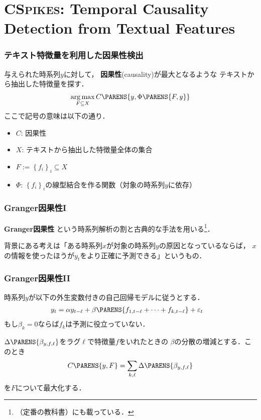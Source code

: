 \documentclass[12pt,noamssymb,usepdftitle=false]{beamer}
\newcommand{\braces}[1]{\left\{#1\right\}}
\DeclareMathOperator*{\argmax}{arg\,max}
\begin{document}
\section{CS\textsc{pikes}: Temporal Causality Detection from Textual Features}
\begin{frame}
    \frametitle{テキスト特徴量を利用した因果性検出}
    与えられた時系列$y$に対して，
    \textbf{因果性}(causality)が最大となるような
    テキストから抽出した特徴量を探す．
    \begin{align}
        \argmax_{F \subseteq X} {C}\PARENS{y, \Phi\PARENS{F,y}}
    \end{align}
    ここで記号の意味は以下の通り．
    \begin{itemize}
        \item ${C}$: 因果性
        \item $X$: テキストから抽出した特徴量全体の集合
        \item $F:=\braces{f_i}_i \subseteq X$
        \item $\Phi$: $\braces{f_i}_i$の線型結合を作る関数（対象の時系列$y$に依存）
    \end{itemize}

\end{frame}

\begin{frame}
    \frametitle{Granger因果性I}
    \textbf{Granger因果性}\parencite{granger1988}
    という時系列解析の割と古典的な手法を用いる\footnote[frame]{%
        \textcite{hamilton1994}（定番の教科書）にも載っている．
    }．

    \bigskip

    背景にある考えは「ある時系列$x$が対象の時系列$y$の原因となっているならば，
    $x$の情報を使ったほうが$y_t$をより正確に予測できる」というもの．

\end{frame}

\begin{frame}
    \frametitle{Granger因果性II}
    時系列$y$が以下の外生変数付きの自己回帰モデルに従うとする．
    \begin{align}
        y_t &= \alpha y_{t - \ell} + \beta \PARENS{f_{1, t - \ell} + \cdots + f_{k, t - \ell}} + \varepsilon_t
    \end{align}
    もし$\beta_k = 0$ならば$f_k$は予測に役立っていない．

    \bigskip

    $\Delta\PARENS{\beta_{y,f,\ell}}$をラグ$\ell$で特徴量$f$をいれたときの
    $\beta$の分散の増減とする．このとき
    \begin{align*}
        C\PARENS{y,F} = \sum_{k, \ell} \Delta\PARENS{\beta_{y,f,\ell}}
    \end{align*}
    を$F$について最大化する．

\end{frame}
\end{document}
